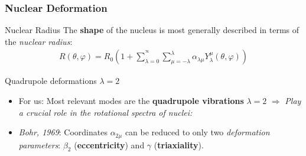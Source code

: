 \documentclass{beamer}
\begin{document}
\begin{frame}
	\frametitle{Nuclear Deformation}
	\begin{exampleblock}{Nuclear Radius}
		The \textbf{shape} of the nucleus is most generally described in terms of the \emph{nuclear radius}:
		\begin{align}
			R(\theta,\varphi)=R_0\left(1+\sum_{\lambda=0}^{^\infty}\sum_{\mu=-\lambda}^\lambda\alpha_{\lambda\mu}Y_\lambda^\mu(\theta,\varphi)\right)\nonumber
		\end{align}
	\end{exampleblock}
	\begin{block}{Quadrupole deformations $\lambda=2$}

		\begin{itemize}
			\item {\color{red}For us:} Most relevant modes are the \textbf{quadrupole vibrations} $\lambda=2$ $\Longrightarrow$ \emph{Play a crucial role in the rotational spectra of nuclei:}
			\item \textit{Bohr, 1969}: Coordinates $\alpha_{2\mu}$ can be reduced to only two \emph{deformation parameters}: $\beta_2$ (\textbf{eccentricity}) and $\gamma$ (\textbf{triaxiality}).
		\end{itemize}
	\end{block}
\end{frame}
\end{document}

